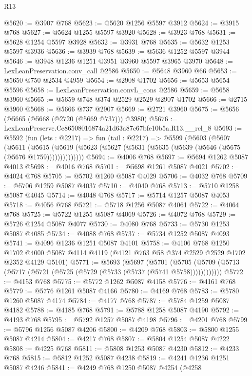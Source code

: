\begin{lexlean}{R13}
\begin{coremodule}
@5620 := @3907 @768
@5623 := @5620 @1256 @5597 @3912
@5624 := @3915 @768
@5627 := @5624 @1255 @5597 @3920
@5628 := @3923 @768
@5631 := @5628 @1254 @5597 @3928
@5632 := @3931 @768
@5635 := @5632 @1253 @5597 @3936
@5636 := @3939 @768
@5639 := @5636 @1252 @5597 @3944
@5646 := @3948 @1236 @1251 @3951 @3960 @5597 @3965 @3970
@5648 := LexLeanPreservation.conv_call @2586
@5650 := @5648 @3960 @66
@5653 := @5650 @750 @2534 @4959
@5654 := @2908 @1702
@5656 := @5653 @5654 @5596
@5658 := LexLeanPreservation.convL_cons @2586
@5659 := @5658 @3960
@5665 := @5659 @748 @374 @2529 @2529 @2907 @1702
@5666 := @2715 @3960
@5668 := @5666 @737 @2907
@5669 := @2721 @3960
@5675 := @5656 (@5665 (@5668 (@2720 (@5669 @737))) @3980)
@5676 := LexLeanPreserve.Ce86508016874a21d63a87c67bfe10b5a.R13.__rel_8
@5693 := @5592
    (fun (lets : @2217) =>
    fun (tail : @2217) =>
    @5599
      (@5603
        (@5607
          (@5611
            (@5615
              (@5619 (@5623 (@5627 (@5631 (@5635 (@5639 (@5646 (@5675 (@5676 @1759))))))))))))))
@5694 := @4006 @768
@5697 := @5694 @1262 @5087 @4013
@5698 := @4016 @768
@5701 := @5698 @1261 @5087 @4021
@5702 := @4024 @768
@5705 := @5702 @1260 @5087 @4029
@5706 := @4032 @768
@5709 := @5706 @1259 @5087 @4037
@5710 := @4040 @768
@5713 := @5710 @1258 @5087 @4045
@5714 := @4048 @768
@5717 := @5714 @1257 @5087 @4053
@5718 := @4056 @768
@5721 := @5718 @1256 @5087 @4061
@5722 := @4064 @768
@5725 := @5722 @1255 @5087 @4069
@5726 := @4072 @768
@5729 := @5726 @1254 @5087 @4077
@5730 := @4080 @768
@5733 := @5730 @1253 @5087 @4085
@5734 := @4088 @768
@5737 := @5734 @1252 @5087 @4093
@5741 := @4096 @1236 @1251 @5087 @4101
@5758 := @4106
    @768
    @1250
    @1702
    @4000
    @5087
    @4114
    @4119
    (@4121 @763 @58 @374 @2529 @2529 @1702 @2352 @4129 @5101)
@5771 := @5693
    (@5697
      (@5701 (@5705 (@5709 (@5713 (@5717 (@5721 (@5725 (@5729 (@5733 (@5737 (@5741 @5758))))))))))))
@5772 := @4153 @768
@5775 := @5772 @1262 @5087 @4158
@5776 := @4161 @768
@5779 := @5776 @1261 @5087 @4166
@5780 := @4169 @768
@5783 := @5780 @1260 @5087 @4174
@5784 := @4177 @768
@5787 := @5784 @1259 @5087 @4182
@5788 := @4185 @768
@5791 := @5788 @1258 @5087 @4190
@5792 := @4193 @768
@5795 := @5792 @1257 @5087 @4198
@5796 := @4201 @768
@5799 := @5796 @1256 @5087 @4206
@5800 := @4209 @768
@5803 := @5800 @1255 @5087 @4214
@5804 := @4217 @768
@5807 := @5804 @1254 @5087 @4222
@5808 := @4225 @768
@5811 := @5808 @1253 @5087 @4230
@5812 := @4233 @768
@5815 := @5812 @1252 @5087 @4238
@5819 := @4241 @1236 @1251 @5087 @4246
@5841 := @4249
    @768
    @1250
    @5087
    @4254
    (@4258

\end{coremodule}
\end{lexlean}
